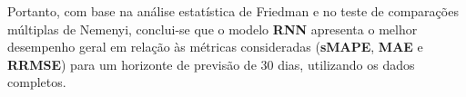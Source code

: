 Portanto, com base na análise estatística de Friedman e no teste de comparações múltiplas de Nemenyi, conclui-se que o modelo \textbf{RNN} apresenta o melhor desempenho geral em relação às métricas consideradas (\textbf{sMAPE}, \textbf{MAE} e \textbf{RRMSE}) para um horizonte de previsão de 30 dias, utilizando os dados completos.


